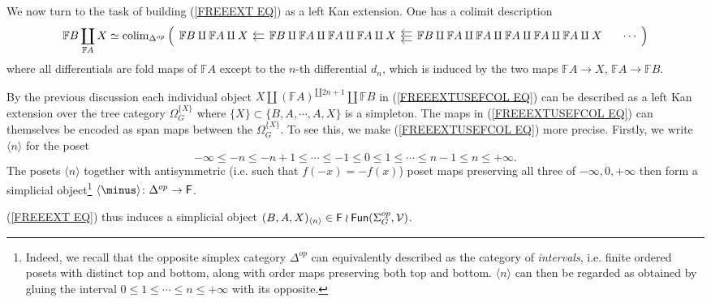 \documentclass[a4paper,10pt]{article}%
\begin{document}
We now turn to the task of building (\ref{FREEEXT EQ})
as a left Kan extension. One has a colimit description
\begin{equation}\label{FREEEXTUSEFCOL EQ}
	\mathbb{F} B \coprod_{\mathbb{F} A} X
\simeq
	\colim_{\Delta^{op}} \left(
\begin{tikzcd}[column sep = 1em]
	\mathbb{F} B \amalg \mathbb{F} A \amalg X &
	\mathbb{F} B \amalg \mathbb{F} A \amalg \mathbb{F} A \amalg \mathbb{F} A  \amalg X
	\ar[l,shift left=2pt] \ar[l,shift left=-2pt] &	
	\mathbb{F} B \amalg \mathbb{F} A \amalg \mathbb{F} A \amalg \mathbb{F} A \amalg \mathbb{F} A \amalg \mathbb{F} A  \amalg X
	\ar[l,shift left=4pt] \ar[l,shift left=-4pt]  \ar[l] &
	\cdots
\end{tikzcd}
	\right)
\end{equation}
where all differentials are fold maps of $\mathbb{F} A$ except to the $n$-th differential $d_n$, which is induced by the two maps $\mathbb{F}A \to X$, $\mathbb{F}A \to \mathbb{F}B$.

By the previous discussion each individual object 
$X \amalg (\mathbb{F}A)^{\amalg 2n+1} \amalg \mathbb{F}B$ in
(\ref{FREEEXTUSEFCOL EQ})
can be described as a left Kan extension over the tree category 
$\Omega_{G}^{\{X\}}$ where 
$\{X\} \subset \{B,A,\cdots,A,X\}$ is a simpleton.
The maps in (\ref{FREEEXTUSEFCOL EQ}) can themselves be encoded as span maps between the $\Omega_{G}^{\{X\}}$.
To see this, we make (\ref{FREEEXTUSEFCOL EQ}) more precise.
Firstly, we write $\langle n \rangle$ for the poset
\[
	- \infty \leq -n \leq -n+1 \leq
\cdots
	\leq -1 \leq 0 \leq 1 \leq
\cdots
	\leq n-1 \leq n \leq + \infty.
\]
The posets $\langle n \rangle$ together with antisymmetric (i.e. such that $f(-x)=-f(x)$) poset maps preserving all three of $-\infty, 0, +\infty$
then form a simplicial object\footnote{Indeed, we recall that the opposite simplex category $\Delta^{op}$ can equivalently described as the category of \textit{intervals}, i.e. finite ordered posets with distinct top and bottom, along with order maps preserving both top and bottom.
$\langle n \rangle$ can then be regarded as obtained by gluing the interval $0\leq 1 \leq \cdots \leq n \leq + \infty$ with its opposite.}
$\langle \minus \rangle \colon \Delta^{op} \to \Fin$.


(\ref{FREEEXT EQ}) thus induces a simplicial object
$(B,A,X)_{\langle n \rangle} \in \mathsf{F} \wr \mathsf{Fun}(\Sigma_G^{op}, \mathcal{V})$.
\end{document}
